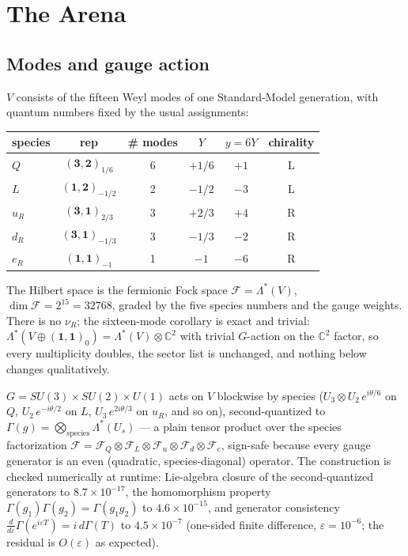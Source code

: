 \documentclass[11pt]{article}
\newcommand{\CC}{\mathbb{C}}
\newcommand{\Fock}{\mathcal{F}}
\newcommand{\rep}[2]{(\mathbf{#1})_{#2}}
\begin{document}
\section{The Arena}\label{sec:setup}

\subsection{Modes and gauge action}

$V$ consists of the fifteen Weyl modes of one Standard-Model generation, with quantum numbers fixed by the usual assignments:

\begin{center}
\small
\begin{tabular}{lccccc}
\toprule
species & rep & \# modes & $Y$ & $y=6Y$ & chirality \\
\midrule
$Q$ & $\rep{3,2}{1/6}$ & 6 & $+1/6$ & $+1$ & L \\
$L$ & $\rep{1,2}{-1/2}$ & 2 & $-1/2$ & $-3$ & L \\
$u_R$ & $\rep{3,1}{2/3}$ & 3 & $+2/3$ & $+4$ & R \\
$d_R$ & $\rep{3,1}{-1/3}$ & 3 & $-1/3$ & $-2$ & R \\
$e_R$ & $\rep{1,1}{-1}$ & 1 & $-1$ & $-6$ & R \\
\bottomrule
\end{tabular}
\end{center}

The Hilbert space is the fermionic Fock space $\Fock = \Lambda^*(V)$, $\dim\Fock = 2^{15} = 32768$, graded by the five species numbers and the gauge weights. There is no $\nu_R$; the sixteen-mode corollary is exact and trivial: $\Lambda^*(V\oplus\rep{1,1}{0}) = \Lambda^*(V)\otimes\CC^2$ with trivial $G$-action on the $\CC^2$ factor, so every multiplicity doubles, the sector list is unchanged, and nothing below changes qualitatively.

$G = SU(3)\times SU(2)\times U(1)$ acts on $V$ blockwise by species ($U_3\otimes U_2\, e^{i\theta/6}$ on $Q$, $U_2\, e^{-i\theta/2}$ on $L$, $U_3\, e^{2i\theta/3}$ on $u_R$, and so on), second-quantized to $\Gamma(g) = \bigotimes_{\mathrm{species}} \Lambda^*(U_s)$ --- a plain tensor product over the species factorization $\Fock = \Fock_Q\otimes\Fock_L\otimes\Fock_u\otimes\Fock_d\otimes\Fock_e$, sign-safe because every gauge generator is an even (quadratic, species-diagonal) operator. The construction is checked numerically at runtime: Lie-algebra closure of the second-quantized generators to $8.7\times10^{-17}$, the homomorphism property $\Gamma(g_1)\Gamma(g_2)=\Gamma(g_1g_2)$ to $4.6\times10^{-15}$, and generator consistency $\frac{d}{d\varepsilon}\Gamma(e^{i\varepsilon T}) = i\,d\Gamma(T)$ to $4.5\times10^{-7}$ (one-sided finite difference, $\varepsilon=10^{-6}$; the residual is $O(\varepsilon)$ as expected).
\end{document}
